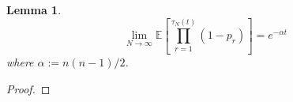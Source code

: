 \documentclass{article}
\newtheorem{lemma}{Lemma}
\newcommand{\E}{\mathbb{E}}
\newcommand{\1}[1]{\mathbb{I}_{#1}}
\begin{document}
\begin{lemma}
\begin{equation}
\lim_{N\to\infty} \E\left[ \prod_{r=1}^{\tau_N(t)} (1-p_r) \right] = e^{-\alpha t}
\end{equation}
where $\alpha := n(n-1)/2$.
\end{lemma}
\begin{proof}

\end{proof}
\end{document}
